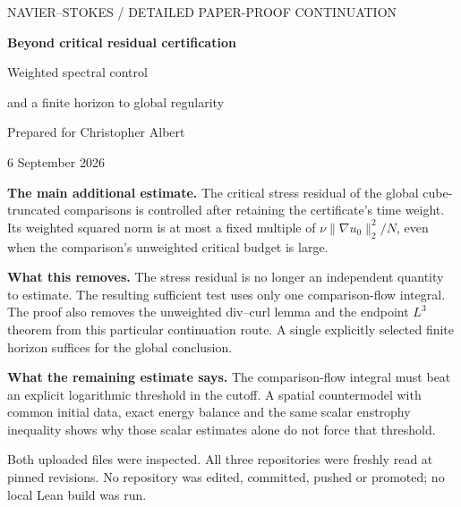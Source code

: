 \documentclass[11pt,a4paper]{article}
\theoremstyle{definition}\newtheorem{definition}[theorem]{Definition}
\theoremstyle{remark}\newtheorem{remark}[theorem]{Remark}
\newcommand{\norm}[1]{\lVert #1\rVert}
\numberwithin{equation}{section}
\begin{document}
\hypersetup{pageanchor=false}
\begin{titlepage}\thispagestyle{empty}
\vspace*{7mm}
{\sffamily\small\color{blue!40!black} NAVIER--STOKES / DETAILED PAPER-PROOF CONTINUATION\par}
\vspace{10mm}
{\LARGE\bfseries Beyond critical residual certification\par}
\vspace{6mm}
{\Large Weighted spectral control\par and a finite horizon to global regularity\par}
\vspace{9mm}
Prepared for Christopher Albert\par
6 September 2026\par
\vspace{8mm}
\noindent\textbf{The main additional estimate.} The critical stress residual of the global cube-truncated comparisons is controlled after retaining the certificate's time weight. Its weighted squared norm is at most a fixed multiple of $\nu\norm{\nabla u_0}_2^2/N$, even when the comparison's unweighted critical budget is large.

\noindent\textbf{What this removes.} The stress residual is no longer an independent quantity to estimate. The resulting sufficient test uses only one comparison-flow integral. The proof also removes the unweighted div--curl lemma and the endpoint $L^3$ theorem from this particular continuation route. A single explicitly selected finite horizon suffices for the global conclusion.

\noindent\textbf{What the remaining estimate says.} The comparison-flow integral must beat an explicit logarithmic threshold in the cutoff. A spatial countermodel with common initial data, exact energy balance and the same scalar enstrophy inequality shows why those scalar estimates alone do not force that threshold.\par
\vspace{4mm}
\noindent{}\par
\vfill
{\small Both uploaded files were inspected. All three repositories were freshly read at pinned revisions. No repository was edited, committed, pushed or promoted; no local Lean build was run.}
\end{titlepage}
\hypersetup{pageanchor=true}
{\small\setlength{\parskip}{0pt}\tableofcontents}
\newpage
\end{document}
